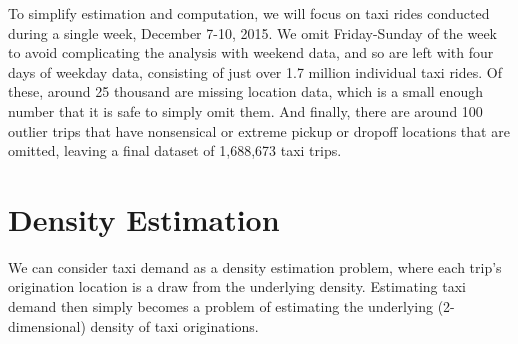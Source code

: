 \documentclass[12pt]{article}
\theoremstyle{definition}
\theoremstyle{algodesc}
\begin{document}
To simplify estimation and computation, we will focus on taxi rides conducted during a single week, December 7-10, 2015. We omit Friday-Sunday of the week to avoid complicating the analysis with weekend data, and so are left with four days of weekday data, consisting of just over 1.7 million individual taxi rides. Of these, around 25 thousand are missing location data, which is a small enough number that it is safe to simply omit them. And finally, there are around 100 outlier trips that have nonsensical or extreme pickup or dropoff locations that are omitted, leaving a final dataset of 1,688,673 taxi trips.


\section{Density Estimation}
We can consider taxi demand as a density estimation problem, where each trip's origination location is a draw from the underlying density. Estimating taxi demand then simply becomes a problem of estimating the underlying (2-dimensional) density of taxi originations.
\end{document}
